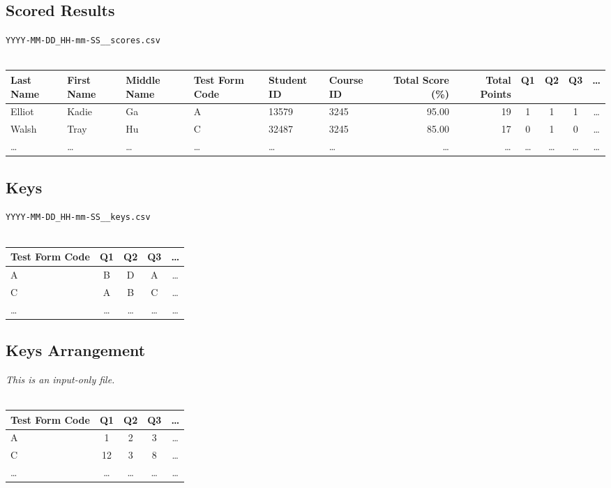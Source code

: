 \documentclass[12pt, letterpaper]{report}
\begin{document}
\begin{appendices}
\begin{landscape}
\subsection{Scored Results}
\label{sect:scoredresults}
\verb!YYYY-MM-DD_HH-mm-SS__scores.csv!\\
\\
\begin{tabular}{ l | l | l | l | l | l | r | r  | c | c | c | c }
  Last Name & First Name & Middle Name & Test Form Code & Student ID & Course ID & Total Score (\%) & Total Points & Q1 & Q2 & Q3 & \ldots \\
  \hline
  Elliot & Kadie  & Ga     & A      & 13579  & 3245   & 95.00  & 19     & 1      & 1      & 1      & \ldots \\
  Walsh  & Tray   & Hu     & C      & 32487  & 3245   & 85.00  & 17     & 0      & 1      & 0      & \ldots \\
  \ldots & \ldots & \ldots & \ldots & \ldots & \ldots & \ldots & \ldots & \ldots & \ldots & \ldots & \ldots
\end{tabular}
\subsection{Keys}
\label{sect:keys}
\verb!YYYY-MM-DD_HH-mm-SS__keys.csv!\\
\\
\begin{tabular}{ l | c | c | c | c }
  Test Form Code & Q1 & Q2 & Q3 & \ldots \\
  \hline
  A      & B      & D      & A      & \ldots \\
  C      & A      & B      & C      & \ldots \\
  \ldots & \ldots & \ldots & \ldots & \ldots
\end{tabular}
\subsection{Keys Arrangement}
\label{sect:keysarrangement}
\textit{This is an input-only file.}\\
\\
\begin{tabular}{ l | c | c | c | c }
  Test Form Code & Q1 & Q2 & Q3 & \ldots \\
  \hline
  A      & 1      & 2      & 3      & \ldots \\
  C      & 12     & 3      & 8      & \ldots \\
  \ldots & \ldots & \ldots & \ldots & \ldots
\end{tabular}
\end{landscape}
\restoregeometry
\end{appendices}
\end{document}
